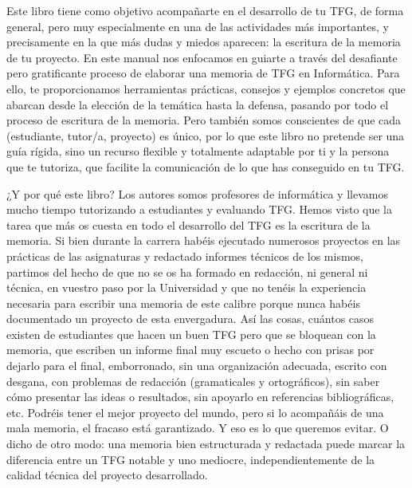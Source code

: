 Este libro tiene como objetivo acompañarte en el desarrollo de tu TFG, de forma general, pero muy especialmente en una de las actividades más importantes, y precisamente en la que más dudas y miedos aparecen: la escritura de la memoria de tu proyecto. En este manual nos enfocamos en guiarte a través del desafiante pero gratificante proceso de elaborar una memoria de TFG en Informática. Para ello, te proporcionamos herramientas prácticas, consejos y ejemplos concretos que abarcan desde la elección de la temática hasta la defensa, pasando por todo el proceso de escritura de la memoria. Pero también somos conscientes de que cada (estudiante, tutor/a, proyecto) es único, por lo que este libro no pretende ser una guía rígida, sino un recurso flexible y totalmente adaptable por ti y la persona que te tutoriza, que facilite la comunicación de lo que has conseguido en tu TFG.

¿Y por qué este libro? Los autores somos profesores de informática y llevamos mucho tiempo tutorizando a estudiantes y evaluando TFG. Hemos visto que la tarea que más os cuesta en todo el desarrollo del TFG es la escritura de la memoria. Si bien durante la carrera habéis ejecutado numerosos proyectos en las prácticas de las asignaturas y redactado informes técnicos de los mismos, partimos del hecho de que no se os ha formado en redacción, ni general ni técnica, en vuestro paso por la Universidad y que no tenéis la experiencia necesaria para escribir una memoria de este calibre porque nunca habéis documentado un proyecto de esta envergadura. Así las cosas, cuántos casos existen de estudiantes que hacen un buen TFG pero que se bloquean con la memoria, que escriben un informe final muy escueto o hecho con prisas por dejarlo para el final, emborronado, sin una organización adecuada, escrito con desgana, con problemas de redacción (gramaticales y ortográficos), sin saber cómo presentar las ideas o resultados, sin apoyarlo en referencias bibliográficas, etc. Podréis tener el mejor proyecto del mundo, pero si lo acompañáis de una mala memoria, el fracaso está garantizado. Y eso es lo que queremos evitar. O dicho de otro modo: una memoria bien estructurada y redactada puede marcar la diferencia entre un TFG notable y uno mediocre, independientemente de la calidad técnica del proyecto desarrollado.

